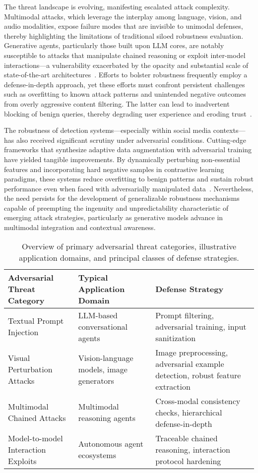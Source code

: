 \documentclass[sigconf]{acmart}
\begin{document}
The threat landscape is evolving, manifesting escalated attack complexity. Multimodal attacks, which leverage the interplay among language, vision, and audio modalities, expose failure modes that are invisible to unimodal defenses, thereby highlighting the limitations of traditional siloed robustness evaluation. Generative agents, particularly those built upon LLM cores, are notably susceptible to attacks that manipulate chained reasoning or exploit inter-model interactions—a vulnerability exacerbated by the opacity and substantial scale of state-of-the-art architectures~\cite{ref85}. Efforts to bolster robustness frequently employ a defense-in-depth approach, yet these efforts must confront persistent challenges such as overfitting to known attack patterns and unintended negative outcomes from overly aggressive content filtering. The latter can lead to inadvertent blocking of benign queries, thereby degrading user experience and eroding trust~\cite{ref67}.

The robustness of detection systems—especially within social media contexts—has also received significant scrutiny under adversarial conditions. Cutting-edge frameworks that synthesize adaptive data augmentation with adversarial training have yielded tangible improvements. By dynamically perturbing non-essential features and incorporating hard negative samples in contrastive learning paradigms, these systems reduce overfitting to benign patterns and sustain robust performance even when faced with adversarially manipulated data~\cite{ref67}. Nevertheless, the need persists for the development of generalizable robustness mechanisms capable of preempting the ingenuity and unpredictability characteristic of emerging attack strategies, particularly as generative models advance in multimodal integration and contextual awareness.

\begin{table*}[htbp]
\centering
\caption{Overview of primary adversarial threat categories, illustrative application domains, and principal classes of defense strategies.}
\label{tab:threat_types}
\begin{adjustbox}{max width=\textwidth}
\begin{tabular}{lll}
\toprule
\textbf{Adversarial Threat Category} & \textbf{Typical Application Domain} & \textbf{Defense Strategy} \\
\midrule
Textual Prompt Injection & LLM-based conversational agents & Prompt filtering, adversarial training, input sanitization \\
Visual Perturbation Attacks & Vision-language models, image generators & Image preprocessing, adversarial example detection, robust feature extraction \\
Multimodal Chained Attacks & Multimodal reasoning agents & Cross-modal consistency checks, hierarchical defense-in-depth \\
Model-to-model Interaction Exploits & Autonomous agent ecosystems & Traceable chained reasoning, interaction protocol hardening \\
\bottomrule
\end{tabular}
\end{adjustbox}
\end{table*}
\end{document}
